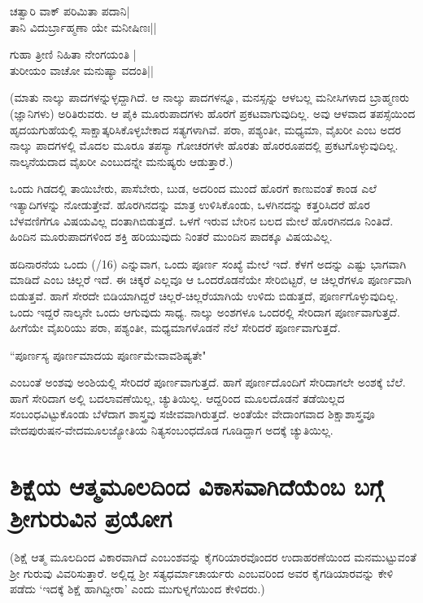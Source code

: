 \begin{shloka}
ಚತ್ವಾರಿ ವಾಕ್ ಪರಿಮಿತಾ ಪದಾನಿ|\\
ತಾನಿ ವಿದುರ್ಬ್ರಾಹ್ಮಣಾ ಯೇ ಮನೀಷಿಣಃ||
\end{shloka}

\begin{shloka}
ಗುಹಾ ತ್ರೀಣಿ ನಿಹಿತಾ ನೇಂಗಯಂತಿ |\\
ತುರೀಯಂ ವಾಚೋ ಮನುಷ್ಯಾ ವದಂತಿ||
\end{shloka}

(ಮಾತು ನಾಲ್ಕು ಪಾದಗಳನ್ನುಳ್ಳದ್ದಾಗಿದೆ. ಆ ನಾಲ್ಕು  ಪಾದಗಳನ್ನೂ, ಮನಸ್ಸನ್ನು ಆಳಬಲ್ಲ ಮನೀಸಿಗಳಾದ ಬ್ರಾಹ್ಮಣರು (ಜ್ಞಾನಿಗಳು) ಅರಿತಿರುವರು. ಆ ಪೈಕಿ ಮೂರುಪಾದಗಳು ಹೊರಗೆ ಪ್ರಕಟವಾಗುವುದಿಲ್ಲ. ಅವು ಆಳವಾದ ತಪಸ್ಸೆಯಿಂದ ಹೃದಯಗುಹೆಯಲ್ಲಿ ಸಾಕ್ಷಾತ್ಕರಿಸಿಕೊಳ್ಳಬೇಕಾದ ಸತ್ಯಗಳಾಗಿವೆ. ಪರಾ, ಪಶ್ಯಂತೀ, ಮಧ್ಯಮಾ, ವೈಖರೀ ಎಂಬ ಅದರ ನಾಲ್ಕು  ಪಾದಗಳಲ್ಲಿ ಮೊದಲ ಮೂರೂ ತಪಸ್ಯಾ ಗೋಚರಗಳೇ ಹೊರತು ಹೊರರೂಪದಲ್ಲಿ ಪ್ರಕಟಗೊಳ್ಳುವುದಿಲ್ಲ. ನಾಲ್ಕನೆಯದಾದ ವೈಖರೀ ಎಂಬುದನ್ನೇ ಮನುಷ್ಯರು ಆಡುತ್ತಾರೆ.)

ಒಂದು ಗಿಡದಲ್ಲಿ ತಾಯಿಬೇರು, ಪಾಸೆಬೇರು, ಬುಡ, ಅದರಿಂದ ಮುಂದೆ ಹೊರಗೆ ಕಾಣುವಂತೆ ಕಾಂಡ ಎಲೆ ಇತ್ಯಾದಿಗಳನ್ನು ನೋಡುತ್ತೇವೆ. ಹೊರಗಿನದನ್ನು ಮಾತ್ರ ಉಳಿಸಿಕೊಂಡು, ಒಳಗಿನದನ್ನು ಕತ್ತರಿಸಿದರೆ ಹೊರ ಬೆಳವಣಿಗೆಗೂ ವಿಷಯವಿಲ್ಲ ದಂತಾಗಿಬಿಡುತ್ತದೆ. ಒಳಗೆ ಇರುವ ಬೇರಿನ ಬಲದ ಮೇಲೆ ಹೊರಗಿನದೂ ನಿಂತಿದೆ. ಹಿಂದಿನ ಮೂರುಪಾದಗಳಿಂದ ಶಕ್ತಿ ಹರಿಯುವುದು ನಿಂತರೆ ಮುಂದಿನ ಪಾದಕ್ಕೂ  ವಿಷಯವಿಲ್ಲ.

ಹದಿನಾರನೆಯ ಒಂದು {(/16)} ಎನ್ನುವಾಗ, ಒಂದು ಪೂರ್ಣ ಸಂಖ್ಯೆ ಮೇಲೆ ಇದೆ. ಕೆಳಗೆ ಅದನ್ನು ಎಷ್ಟು ಭಾಗವಾಗಿ ಮಾಡಿದೆ ಎಂಬ ಚಿಲ್ಲರೆ ಇದೆ. ಈ ಚಿಕ್ಕರೆ ಎಲ್ಲವೂ ಆ ಒಂದರೊಡನೆಯೇ ಸೇರಿಬಿಟ್ಟರೆ, ಆ ಚಿಲ್ಲರೆಗಳೂ ಪೂರ್ಣವಾಗಿ ಬಿಡುತ್ತವೆ. ಹಾಗೆ ಸೇರದೇ ಬಿಡಿಯಾಗಿದ್ದರೆ ಚಿಲ್ಲರೆ-ಚಿಲ್ಲರೆಯಾಗಿಯೆ ಉಳಿದು ಬಿಡುತ್ತದೆ, ಪೂರ್ಣಗೊಳ್ಳುವುದಿಲ್ಲ. ಒಂದು ಇದ್ದರೆ ನಾಲ್ಕನೇ ಒಂದು ಆಗುವುದು ಸಾಧ್ಯ. ನಾಲ್ಕು ಅಂಶಗಳೂ ಒಂದರಲ್ಲಿ ಸೇರಿದಾಗ ಪೂರ್ಣವಾಗುತ್ತದೆ. ಹೀಗೆಯೇ ವೈಖರಿಯು ಪರಾ, ಪಶ್ಯಂತೀ, ಮಧ್ಯಮಾಗಳೊಡನೆ ನೆಲೆ ಸೇರಿದರೆ ಪೂರ್ಣವಾಗುತ್ತದೆ.
\begin{shloka}
``ಪೂರ್ಣಸ್ಯ ಪೂರ್ಣಮಾದಯ ಪೂರ್ಣಮೇವಾವಶಿಷ್ಯತೇ"
\end{shloka}

ಎಂಬಂತೆ ಅಂಶವು ಅಂಶಿಯಲ್ಲಿ ಸೇರಿದರೆ ಪೂರ್ಣವಾಗುತ್ತದೆ. ಹಾಗೆ ಪೂರ್ಣದೊಂದಿಗೆ ಸೇರಿದಾಗಲೇ ಅಂಶಕ್ಕೆ ಬೆಲೆ. ಹಾಗೆ ಸೇರಿದಾಗ ಅಲ್ಲಿ ಬದಲಾವಣೆಯಿಲ್ಲ, ಚ್ಯುತಿಯಿಲ್ಲ. ಆದ್ದರಿಂದ  ಮೂಲದೊಡನೆ ತಡೆಯಿಲ್ಲದ ಸಂಬಂಧವಿಟ್ಟುಕೊಂಡು ಬೆಳೆದಾಗ ಶಾಸ್ತ್ರವು ಸಜೀವವಾಗಿರುತ್ತದೆ. ಅಂತೆಯೇ ವೇದಾಂಗವಾದ ಶಿಕ್ಷಾಶಾಸ್ತ್ರವೂ ವೇದಪುರುಷನ-ವೇದಮೂಲಜ್ಯೋತಿಯ ನಿತ್ಯಸಂಬಂಧದೊಡ ಗೂಡಿದ್ದಾಗ  ಅದಕ್ಕೆ  ಚ್ಯುತಿಯಿಲ್ಲ.

\section*{ಶಿಕ್ಷೆಯ ಆತ್ಮಮೂಲದಿಂದ ವಿಕಾಸವಾಗಿದೆಯೆಂಬ ಬಗ್ಗೆ ಶ್ರೀಗುರುವಿನ ಪ್ರಯೋಗ}

(ಶಿಕ್ಷೆ ಆತ್ಮ ಮೂಲದಿಂದ ವಿಕಾರವಾಗಿದೆ ಎಂಬಂಶವನ್ನು ಕೈಗರಿಯಾರವೊಂದರ ಉದಾಹರಣೆಯಿಂದ ಮನಮುಟ್ಟುವಂತೆ ಶ್ರೀ ಗುರುವು ವಿವರಿಸುತ್ತಾರೆ. ಅಲ್ಲಿದ್ದ ಶ್ರೀ ಸತ್ಯಧರ್ಮಾಚಾರ್ಯರು  ಎಂಬವರಿಂದ ಅವರ ಕೈಗಡಿಯಾರವನ್ನು ಕೇಳಿ ಪಡೆದು `ಇದಕ್ಕೆ ಶಿಕ್ಷೆ ಹಾಗಿದ್ದೀರಾ' ಎಂದು ಮುಗುಳ್ನಗೆಯಿಂದ ಕೇಳಿದರು.)

